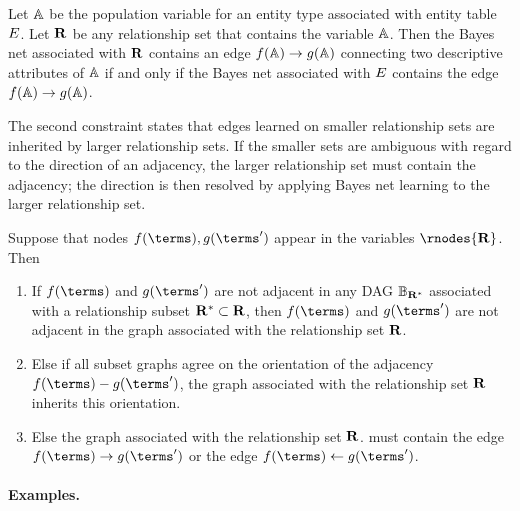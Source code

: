 \begin{constraint} \label{clause:econstraints} Let $\mathbb{A}$ be the population variable for an entity type associated with entity table $E$. Let $\mathbf{R}$ be any relationship set that contains the variable $\mathbb{A}$. Then the Bayes net associated with $\mathbf{R}$ contains an edge $f(\mathbb{A}) \rightarrow g(\mathbb{A})$ connecting two descriptive attributes of $\mathbb{A}$ if and only if the Bayes net associated with $E$ contains the edge $f(\mathbb{A}) \rightarrow g(\mathbb{A})$.
\end{constraint}

The second constraint states that edges learned on smaller relationship sets are inherited by larger relationship sets. If the smaller sets are ambiguous with regard to the direction of an adjacency, the larger relationship set must contain the adjacency; the direction is then resolved by applying Bayes net learning to the larger relationship set.

\begin{constraint} \label{clause:rconstraints} Suppose that nodes $\functor(\terms),g(\terms')$ appear in the variables $\rnodes{\set{\Relation}}$. %
Then
\begin{enumerate}
\item  If $\functor(\terms)$ and $g(\terms')$ are not adjacent in any DAG $\mathbb{B}_{\mathbf{R}^{*}}$ associated with a relationship subset $\mathbf{R}^{*} \subset \mathbf{R}$, then $\functor(\terms)$ and $g(\terms')$ are not adjacent in the graph associated with the relationship set $\mathbf{R}$.
\item Else if all subset graphs agree on the orientation of the adjacency  $\functor(\terms)-g(\terms')$, the graph associated with the relationship set $\mathbf{R}$ inherits this orientation.
\item Else the graph associated with the relationship set $\mathbf{R}$. must contain the edge $\functor(\terms) \rightarrow g(\terms')$ or the edge $\functor(\terms) \leftarrow g(\terms')$.
\end{enumerate}
\end{constraint}

\paragraph{Examples.}

